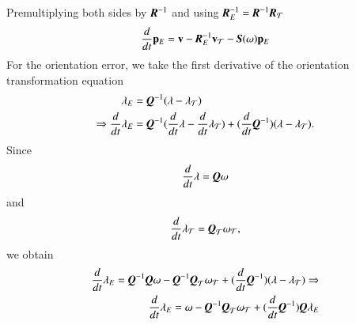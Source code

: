 Premultiplying both sides by $\emph{\textbf{R}}^{-1}$ and using $ \emph{\textbf{R}}_{E}^{-1}=\emph{\textbf{R}}^{-1}\emph{\textbf{R}}_{\mathcal{T}}$
\begin{align}
\dfrac{d}{dt}\vec{p}_{E}=\vec{v}-\emph{\textbf{R}}_{E}^{-1}\vec{v}_{\mathcal{T}}
-\emph{\textbf{S}}(\vec{\omega})\vec{p}_{E}
\end{align}
For the orientation error, we take the first derivative of the orientation transformation equation
\begin{align}
\vec{\lambda}_{E}&=\emph{\textbf{Q}}^{-1}(\vec{\lambda}-\vec{\lambda}_{\mathcal{T}}) \nonumber \\ \Rightarrow
\dfrac{d}{dt}\vec{\lambda}_{E}&=\emph{\textbf{Q}}^{-1}(\dfrac{d}{dt}\vec{\lambda}-\dfrac{d}{dt}\vec{\lambda}_{\mathcal{T}})+(\dfrac{d}{dt}\emph{\textbf{Q}}^{-1})(\vec{\lambda}-\vec{\lambda}_{\mathcal{T}}).
\end{align}
Since 
\begin{align}
\dfrac{d}{dt}\vec{\lambda}=\emph{\textbf{Q}}\vec{\omega}
\end{align}
and 
\begin{align}
\dfrac{d}{dt}\vec{\lambda}_{\mathcal{T}}=\emph{\textbf{Q}}_{\mathcal{T}}
\vec{\omega}_{\mathcal{T}},
\end{align}
we obtain 
\begin{align}
\dfrac{d}{dt}\vec{\lambda}_{E}=\emph{\textbf{Q}}^{-1}\emph{\textbf{Q}}\vec{\omega}
-\emph{\textbf{Q}}^{-1}\emph{\textbf{Q}}_{\mathcal{T}}
\vec{\omega}_{\mathcal{T}}
+(\dfrac{d}{dt}\emph{\textbf{Q}}^{-1})(\vec{\lambda}-\vec{\lambda}_{\mathcal{T}})\Rightarrow \nonumber \\
\dfrac{d}{dt}\vec{\lambda}_{E}=\vec{\omega}
-\emph{\textbf{Q}}^{-1}\emph{\textbf{Q}}_{\mathcal{T}}
\vec{\omega}_{\mathcal{T}}
+(\dfrac{d}{dt}\emph{\textbf{Q}}^{-1})\emph{\textbf{Q}}\vec{\lambda}_{E}
\end{align}

